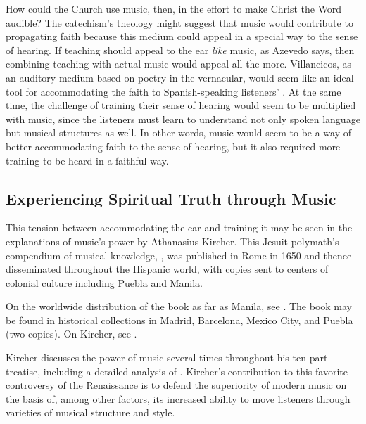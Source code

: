 How could the Church use music, then, in the effort to make Christ the Word 
audible?
The catechism's theology might suggest that music would contribute to 
propagating faith because this medium could appeal in a special way to the 
sense of hearing.
If teaching should appeal to the ear \emph{like} music, as Azevedo says, then 
combining teaching with actual music would appeal all the more.
Villancicos, as an auditory medium based on poetry in the vernacular, would 
seem like an ideal tool for accommodating the faith to Spanish-speaking 
listeners' .
At the same time, the challenge of training their sense of hearing would seem 
to be multiplied with music, since the listeners must learn to understand not 
only spoken language but musical structures as well.
In other words, music would seem to be a way of better accommodating faith to 
the sense of hearing, but it also required more training to be heard in a 
faithful way.


\subsection{Experiencing Spiritual Truth through Music}

This tension between accommodating the ear and training it may be seen in the 
explanations of music's power by Athanasius Kircher.
This Jesuit polymath's compendium of musical knowledge, , was published in Rome in 1650 and thence disseminated throughout 
the Hispanic world, with copies sent to centers of colonial culture including 
Puebla and Manila.%
\begin{Footnote}
    On the worldwide distribution of the book as far as Manila, see 
    \autocite[48--50]{Irving:Colonial}.
    The book may be found in historical collections in Madrid, Barcelona, 
    Mexico City, and Puebla (two copies).
    On Kircher, see \autocites{Findlen:Kircher}{Godwin:KircherTheater}.
\end{Footnote}
Kircher discusses the power of music several times throughout his ten-part 
treatise, including a detailed analysis of .%
    \Autocite
    [bk.~VII, 549: .]
    {Kircher:Musurgia}
Kircher's contribution to this favorite controversy of the Renaissance is to 
defend the superiority of modern music on the basis of, among other factors, 
its increased ability to move listeners through varieties of musical structure 
and style.

